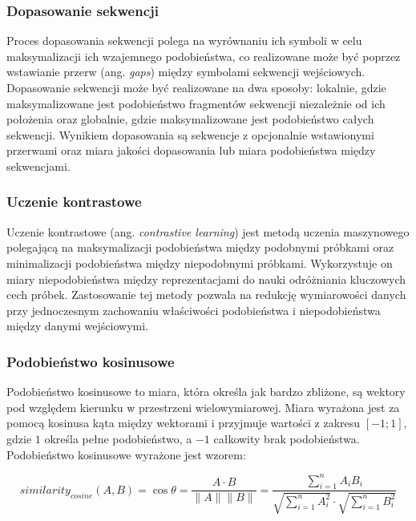         \subsubsection{Dopasowanie sekwencji}

            Proces dopasowania sekwencji polega na wyrównaniu ich symboli w celu maksymalizacji ich wzajemnego podobieństwa, co realizowane może być poprzez wstawianie przerw (ang. \textit{gaps}) między symbolami sekwencji wejściowych. Dopasowanie sekwencji może być realizowane na dwa sposoby: lokalnie, gdzie maksymalizowane jest podobieństwo fragmentów sekwencji niezależnie od ich położenia oraz globalnie, gdzie maksymalizowane jest podobieństwo całych sekwencji. Wynikiem dopasowania są sekwencje z opcjonalnie wstawionymi przerwami oraz miara jakości dopasowania lub miara podobieństwa między sekwencjami.

        \subsubsection{Uczenie kontrastowe}
            
            Uczenie kontrastowe (ang. \textit{contrastive learning})\cite{Bromley1993} jest metodą uczenia maszynowego polegającą na maksymalizacji podobieństwa między podobnymi próbkami oraz minimalizacji podobieństwa między niepodobnymi próbkami. Wykorzystuje on miary niepodobieństwa między reprezentacjami do nauki odróżniania kluczowych cech próbek. Zastosowanie tej metody pozwala na redukcję wymiarowości danych przy jednoczesnym zachowaniu właściwości podobieństwa i niepodobieństwa między danymi wejściowymi.

        \subsubsection{Podobieństwo kosinusowe}

            Podobieństwo kosinusowe to miara, która określa jak bardzo zbliżone, są wektory pod względem kierunku w przestrzeni wielowymiarowej. Miara wyrażona jest za pomocą kosinusa kąta między wektorami i przyjmuje wartości z zakresu $[-1; 1]$, gdzie $1$ określa pełne podobieństwo, a $-1$ całkowity brak podobieństwa. Podobieństwo kosinusowe wyrażone jest wzorem:

            \begin{equation}
                similarity_{cosine}(A, B) = \cos{\theta} = \frac{A \cdot B}{\|A\| \|B\|} = \frac{
                    \sum^{n}_{i = 1}A_i B_i
                }{
                    \sqrt{
                        \sum^{n}_{i = 1}A_i^2
                    }
                    \cdot
                    \sqrt{
                        \sum^{n}_{i = 1}B_i^2
                    }
                }
            \end{equation}

